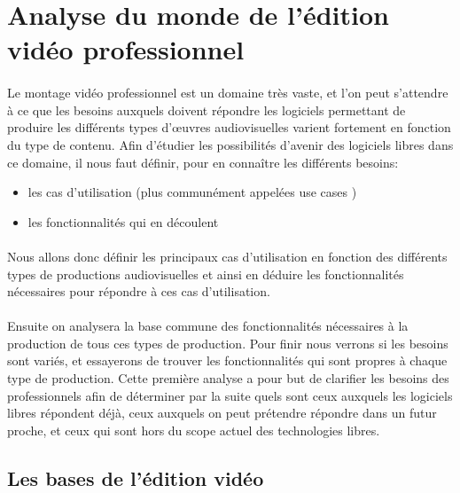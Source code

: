 \newpage

\section {Analyse du monde de l'édition vidéo professionnel}

\paragraph{}
Le montage vidéo professionnel est un domaine très vaste, et l'on peut
s'attendre à ce que les besoins auxquels doivent répondre les logiciels
permettant de produire les différents types d'œuvres audiovisuelles
varient fortement en fonction du type de contenu. Afin d'étudier
les possibilités d'avenir des logiciels libres dans ce domaine, il nous faut
définir, pour en connaître les différents besoins:
\begin {itemize}
  \item {les cas d'utilisation (plus communément appelées use cases )}
  \item {les fonctionnalités qui en découlent}
\end{itemize}


\paragraph{}
Nous allons donc définir les principaux cas d'utilisation en fonction des
différents types de productions audiovisuelles et ainsi en déduire les fonctionnalités
nécessaires pour répondre à ces cas d'utilisation.

\paragraph{}
Ensuite on analysera la base commune des fonctionnalités nécessaires à la
production de tous ces types de production.  Pour finir
nous verrons si les besoins sont variés, et essayerons de trouver les
fonctionnalités qui sont propres à chaque type de production. Cette première
analyse a pour but de clarifier les besoins des professionnels afin de
déterminer par la suite quels sont ceux auxquels les logiciels libres répondent déjà,
ceux auxquels on peut prétendre répondre dans un futur proche, et ceux qui
sont hors du scope actuel des technologies libres.

\subsection{Les bases de l'édition vidéo}

